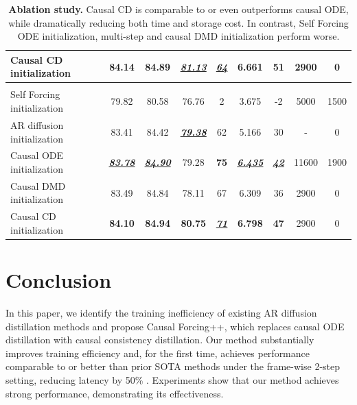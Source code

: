 \documentclass{llmxive}
\begin{document}
\begin{table}
\begin{tabular}{lcccccccc}
      Causal CD initialization  &\textbf{84.14} & \textbf{84.89}  &   \underline{\textbf{\textit{81.13}}} & \underline{\textbf{\textit{64}}} &\textbf{6.661} & \textbf{51} & \cellcolor{green!10}2900& \cellcolor{green!10}0 \\
        \midrule
     \rowcolor{catgray}
    \multicolumn{9}{l}{\textit{4-Step Asymmetric DMD}}\\
     Self Forcing initialization  & 79.82 & 80.58  &  76.76& 2 & 3.675 & -2 &\cellcolor{red!10}5000 &\cellcolor{red!10}1500\\
      AR diffusion initialization  & 83.41 & 84.42  &   \underline{\textbf{\textit{79.38}}} & 62 & 5.166 &  30& \cellcolor{green!10}- &\cellcolor{green!10}0\\
      Causal ODE initialization  & \underline{\textbf{\textit{83.78}}} & \underline{\textbf{\textit{84.90}}}  &   79.28  &  \textbf{75}&\underline{\textbf{\textit{6.435}}} &  \underline{\textbf{\textit{42}}}& \cellcolor{red!10}11600 & \cellcolor{red!10}1900 \\
      Causal DMD initialization  &83.49 & 84.84  &   78.11& 67 & 6.309&  36 & \cellcolor{green!10}2900 & \cellcolor{green!10}0\\
      Causal CD initialization  & \textbf{84.10} & \textbf{84.94}  &   \textbf{80.75} & \underline{\textbf{\textit{71}}} &\textbf{6.798} &  \textbf{47}& \cellcolor{green!10}2900 & \cellcolor{green!10}0\\
    \bottomrule
  \end{tabular}
\caption{\textbf{Ablation study.} Causal CD is comparable to or even outperforms causal ODE, while dramatically reducing both time and storage cost. In contrast, Self Forcing ODE initialization, multi-step and causal DMD initialization perform worse.}
\label{tab:ablation}
\end{table}

\section{Conclusion}

In this paper, we identify the training inefficiency of existing AR diffusion distillation methods and propose Causal Forcing++, which replaces causal ODE distillation with causal consistency distillation. Our method substantially improves training efficiency and, for the first time, achieves performance comparable to or better than prior SOTA methods under the frame-wise 2-step setting, reducing latency by 50\% . Experiments show that our method achieves strong performance, demonstrating its effectiveness.
\end{document}
